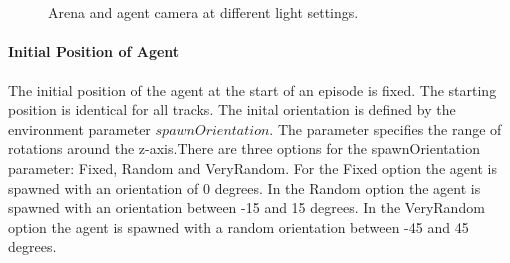 \begin{figure}
    \centering
    \qquad
    \qquad
    \\
    \qquad
    \qquad
    \\
    \caption{Arena and agent camera at different light settings.}
    \label{fig:track_light_settings}
\end{figure}

\paragraph{Initial Position of Agent}
The initial position of the agent at the start of an episode is fixed. The starting position is identical for all tracks. The inital orientation is defined by the environment parameter $spawnOrientation$. The parameter specifies the range of rotations around the z-axis.There are three options for the spawnOrientation parameter: Fixed, Random and VeryRandom. For the Fixed option the agent is spawned with an orientation of 0 degrees. In the Random option the agent is spawned with an orientation between -15 and 15 degrees. In the VeryRandom option the agent is spawned with a random orientation between -45 and 45 degrees.

